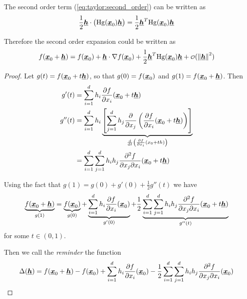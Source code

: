 \documentclass[12pt]{extarticle}
\renewcommand{\vec}[1]{\uvec{#1}}
\newcommand{\Hg}{{\operatorfont Hg}}
\begin{document}
\begin{remark}
    The second order term (\autoref{eq:taylor:second_order}) can be written as
    \begin{equation}
        \frac{1}{2} \vec{h} \cdot \left( \Hg (\vec x_0) \vec h\right) = \frac{1}{2} \vec h^T \Hg(\vec x_0) \vec h
    \end{equation}

    Therefore the second order expansion could be written  as
    \begin{equation}
        f(\vec x_0 + \vec h) = f(\vec x_0) + \vec h \cdot \nabla f(\vec x_0) + \frac{1}{2} \vec h^T \Hg(\vec x_0) \vec h + \o(\norm{\vec h}^2)
    \end{equation}
\end{remark}

\begin{proof}
    Let $g(t) = f(\vec x_0 + t \vec h)$, so that $g(0) = f(\vec x_0)$ and $g(1) = f(\vec x_0 + \vec h)$.
    Then
    \begin{align}
        g'(t)  & = \sum^d_{i = 1} h_i \pdv{f}{x_i}()(\vec x_0 + t \vec h)                                                                                                                         \\
        g''(t) & = \sum^d_{i = 1} h_i \underbrace{\left[ \sum^d_{j = 1} h_j \pdv{x_j}\left( \pdv{f}{x_i}()(\vec x_0 + t\vec h) \right) \right]}_{\dv{t}\left( \pdv{f}{x_i} ()(x_0 + t h) \right)} \\
               & = \sum^d_{i = 1} \sum^d_{j = 1} h_i h_j \pdv[2]{f}{x_j}{x_i}()(\vec x_0 + t \vec h)
    \end{align}

    Using the fact that $g(1) = g(0) + g'(0) + \frac{1}{2} g''(t)$ we have
    \begin{equation}
        \underbrace{f(\vec x_0 + \vec h)}_{g(1)} = \underbrace{f(\vec x_0)}_{g(0)} + \underbrace{\sum^d_{i = 1} h_i \pdv{f}{x_i}()(\vec x_0)}_{g'(0)} + \frac{1}{2} \underbrace{\sum^d_{i = 1} \sum^d_{j = 1} h_i h_j \pdv[2]{f}{x_j}{x_i}()(\vec x_0 + t \vec h)}_{g''(t)}
    \end{equation}
    for some $t \in (0, 1)$.

    Then we call the \textit{reminder} the function
    \begin{equation}
        \Delta(\vec h) = f(\vec x_0 + \vec h) - f(\vec x_0) + \sum^d_{i = 1} h_i \pdv{f}{x_i}()(\vec x_0) - \frac{1}{2} \sum^d_{i = 1} \sum^d_{j = 1} h_i h_j \pdv[2]{f}{x_j}{x_i}()(\vec x_0)
    \end{equation}


\end{proof}
\end{document}
